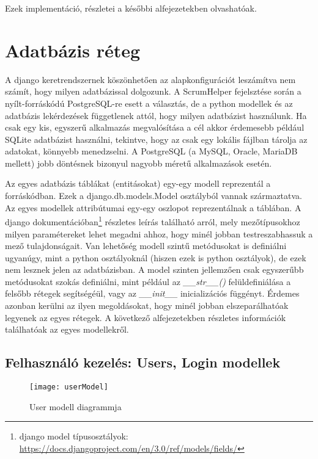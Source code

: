 Ezek implementáció, részletei a későbbi alfejezetekben olvashatóak. 

\section{Adatbázis réteg}
\label{dbmodels}

A django keretrendszernek köszönhetően az alapkonfigurációt leszámítva nem számít, hogy milyen adatbázissal dolgozunk. A ScrumHelper fejelsztése során a nyílt-forráskódú PostgreSQL-re esett a választás, de a python modellek és az adatbázis lekérdezések függetlenek attól, hogy milyen adatbázist használunk. Ha csak egy kis, egyszerű alkalmazás megvalósítása a cél akkor érdemesebb például SQLite adatbázist használni, tekintve, hogy az csak egy lokális fájlban tárolja az adatokat, könnyebb menedzselni. A PostgreSQL (a MySQL, Oracle, MariaDB mellett) jobb döntésnek bizonyul nagyobb méretű alkalmazások esetén. 

Az egyes adatbázis táblákat (entitásokat) egy-egy modell reprezentál a forráskódban. Ezek a django.db.models.Model osztályból vannak származtatva. Az egyes modellek attribútumai egy-egy oszlopot reprezentálnak a táblában. A django dokumentációban\footnote{django model típusosztályok: \url{https://docs.djangoproject.com/en/3.0/ref/models/fields/}} részletes leírás található arról, mely mezőtípusokhoz milyen paramétereket lehet megadni ahhoz, hogy minél jobban testreszabhassuk a mező tulajdonságait. Van lehetőség modell szintű metódusokat is definiálni ugyanúgy, mint a python osztályoknál (hiszen ezek is python osztályok), de ezek nem lesznek jelen az adatbázisban. A model szinten jellemzően csak egyszerűbb metódusokat szokás definiálni, mint például az \textit{\_\_str\_\_()} felüldefiniálása a felsőbb rétegek segítségéül, vagy az \textit{\_\_init\_\_} inicializációs függényt. Érdemes azonban kerülni az ilyen megoldásokat, hogy minél jobban elszeparálhatóak legyenek az egyes rétegek.  A következő alfejezetekben részletes információk találhatóak az egyes modellekről.

\subsection{Felhasználó kezelés: Users, Login modellek}

\begin{figure}[H]
	\centering
	\texttt{[image: userModel]}
	\caption{User modell diagrammja}
	\label{fig:usermodel}
\end{figure}

